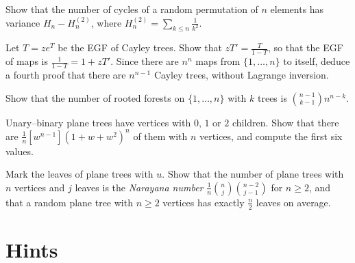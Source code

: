 \begin{exercise}[$\star$]\label{ex:cyclevar}
Show that the number of cycles of a random permutation of $n$ elements has variance $H_n-H_n^{(2)}$, where $H_n^{(2)}=\sum_{k\le n}\frac1{k^2}$.
\end{exercise}

\begin{exercise}[$\star\star$]\label{ex:maps}
Let $T=ze^T$ be the EGF of Cayley trees. Show that $zT'=\frac T{1-T}$, so that the EGF of maps is $\frac1{1-T}=1+zT'$. Since there are $n^n$ maps from $\{1,\dots,n\}$ to itself,
deduce a fourth proof that there are $n^{n-1}$ Cayley trees, without Lagrange inversion.
\end{exercise}

\begin{exercise}[$\star\star$]\label{ex:forests}
Show that the number of rooted forests on $\{1,\dots,n\}$ with $k$ trees is $\binom{n-1}{k-1}n^{n-k}$.
\end{exercise}

\begin{exercise}[$\star$]\label{ex:motzkinlag}
Unary--binary plane trees have vertices with $0$, $1$ or $2$ children. Show that there are $\frac1n[w^{n-1}](1+w+w^2)^n$ of them with $n$ vertices, and compute
the first six values.
\end{exercise}

\begin{exercise}[$\star\star$]\label{ex:leaves}
Mark the leaves of plane trees with $u$. Show that the number of plane trees with $n$ vertices and $j$ leaves is the \emph{Narayana number}
$\frac1n\binom nj\binom{n-2}{j-1}$ for $n\ge2$, and that a random plane tree with $n\ge2$ vertices has exactly $\frac n2$ leaves on average.
\end{exercise}

\section{Hints}

